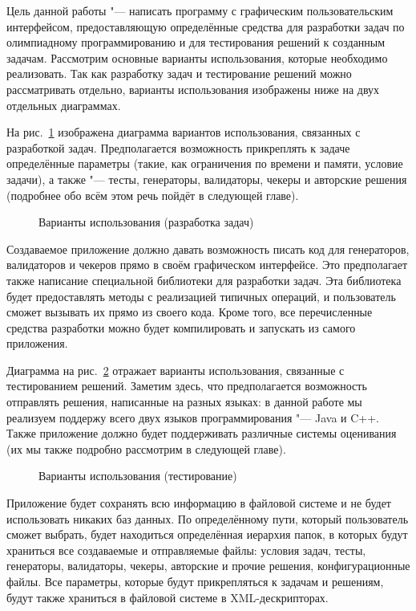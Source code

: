 Цель данной работы "--- написать программу с графическим пользовательским интерфейсом, предоставляющую определённые средства для разработки задач по олимпиадному программированию и для тестирования решений к созданным задачам. Рассмотрим основные варианты использования, которые необходимо реализовать. Так как разработку задач и тестирование решений можно рассматривать отдельно, варианты использования изображены ниже на двух отдельных диаграммах.

На рис.~\ref{use_case_diagram_development} изображена диаграмма вариантов использования, связанных с разработкой задач. Предполагается возможность прикреплять к задаче определённые параметры (такие, как ограничения по времени и памяти, условие задачи), а также "--- тесты, генераторы, валидаторы, чекеры и авторские решения (подробнее обо всём этом речь пойдёт в следующей главе).

\begin{figure}[h]
\caption{Варианты использования (разработка задач)}
\label{use_case_diagram_development}
\end{figure}

Создаваемое приложение должно давать возможность писать код для генераторов, валидаторов и чекеров прямо в своём графическом интерфейсе. Это предполагает также написание специальной библиотеки для разработки задач. Эта библиотека будет предоставлять методы с реализацией типичных операций, и пользователь сможет вызывать их прямо из своего кода. Кроме того, все перечисленные средства разработки можно будет компилировать и запускать из самого приложения.

Диаграмма на рис.~\ref{use_case_diagram_testing} отражает варианты использования, связанные с тестированием решений. Заметим здесь, что предполагается возможность отправлять решения, написанные на разных языках: в данной работе мы реализуем поддержу всего двух языков программирования "--- Java и C++. Также приложение должно будет поддерживать различные системы оценивания (их мы также подробно рассмотрим в следующей главе).

\begin{figure}[h]
\caption{Варианты использования (тестирование)}
\label{use_case_diagram_testing}
\end{figure}

Приложение будет сохранять всю информацию в файловой системе и не будет использовать никаких баз данных. По определённому пути, который пользователь сможет выбрать, будет находиться определённая иерархия папок, в которых будут храниться все создаваемые и отправляемые файлы: условия задач, тесты, генераторы, валидаторы, чекеры, авторские и прочие решения, конфигурационные файлы. Все параметры, которые будут прикрепляться к задачам и решениям, будут также храниться в файловой системе в XML-дескрипторах.